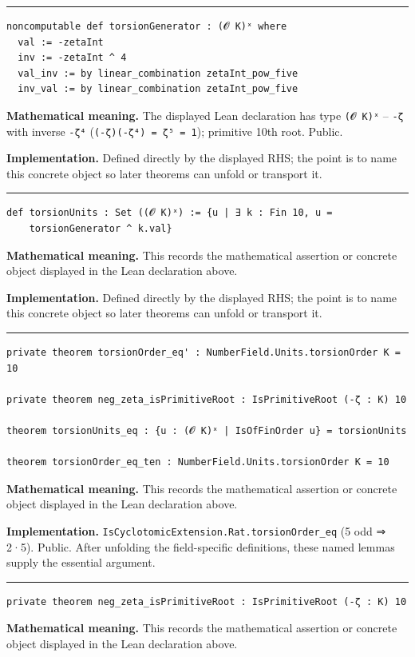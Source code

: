\documentclass[UTF8,a4paper,11pt,fontset=fandol]{ctexart}
\theoremstyle{definition}
\newcommand{\statementsep}{\par\medskip\hrule\medskip}
\begin{document}
\statementsep
\begin{verbatim}
noncomputable def torsionGenerator : (𝓞 K)ˣ where
  val := -zetaInt
  inv := -zetaInt ^ 4
  val_inv := by linear_combination zetaInt_pow_five
  inv_val := by linear_combination zetaInt_pow_five
\end{verbatim}
\noindent\textbf{Mathematical meaning.} The displayed Lean declaration has type \texttt{(𝓞 K)ˣ} -- \texttt{-ζ} with inverse \texttt{-ζ⁴} (\texttt{(-ζ)(-ζ⁴) = ζ⁵ = 1}); primitive 10th root. Public.\par
\noindent\textbf{Implementation.} Defined directly by the displayed RHS; the point is to name this concrete object so later theorems can unfold or transport it.\par
\statementsep
\begin{verbatim}
def torsionUnits : Set ((𝓞 K)ˣ) := {u | ∃ k : Fin 10, u =
    torsionGenerator ^ k.val}
\end{verbatim}
\noindent\textbf{Mathematical meaning.} This records the mathematical assertion or concrete object displayed in the Lean declaration above.\par
\noindent\textbf{Implementation.} Defined directly by the displayed RHS; the point is to name this concrete object so later theorems can unfold or transport it.\par
\statementsep
\begin{verbatim}
private theorem torsionOrder_eq' : NumberField.Units.torsionOrder K = 10

private theorem neg_zeta_isPrimitiveRoot : IsPrimitiveRoot (-ζ : K) 10

theorem torsionUnits_eq : {u : (𝓞 K)ˣ | IsOfFinOrder u} = torsionUnits

theorem torsionOrder_eq_ten : NumberField.Units.torsionOrder K = 10
\end{verbatim}
\noindent\textbf{Mathematical meaning.} This records the mathematical assertion or concrete object displayed in the Lean declaration above.\par
\noindent\textbf{Implementation.} \texttt{IsCyclotomicExtension.\allowbreak{}Rat.\allowbreak{}torsionOrder\_\allowbreak{}eq} (5 odd ⇒ 2·5). Public. After unfolding the field-specific definitions, these named lemmas supply the essential argument.\par
\statementsep
\begin{verbatim}
private theorem neg_zeta_isPrimitiveRoot : IsPrimitiveRoot (-ζ : K) 10
\end{verbatim}
\noindent\textbf{Mathematical meaning.} This records the mathematical assertion or concrete object displayed in the Lean declaration above.\par
\end{document}
